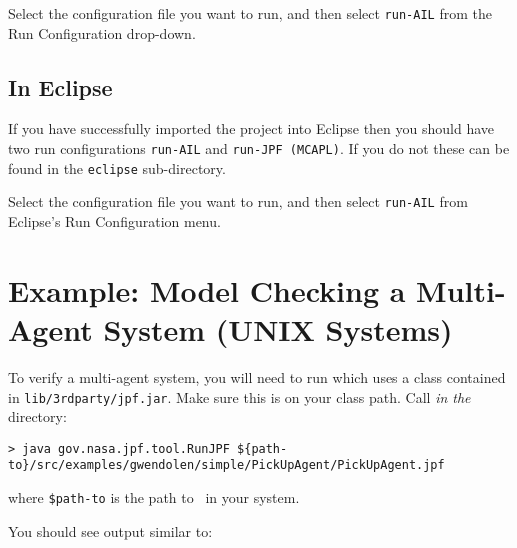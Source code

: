Select the configuration file you want to run, and then select \texttt{run-AIL} from the Run Configuration drop-down.

\subsection{In Eclipse}

If you have successfully imported the project into Eclipse then you should have two run configurations \texttt{run-AIL} and \texttt{run-JPF (MCAPL)}.  If you do not these can be found in the \texttt{eclipse} sub-directory.

Select the configuration file you want to run, and then select \texttt{run-AIL} from Eclipse's Run Configuration menu.


\section{Example: Model Checking a Multi-Agent System (UNIX Systems)}

To verify a multi-agent system, you will need to run \jpf which uses a class contained in \texttt{lib/3rdparty/jpf.jar}.  Make sure this is on your class path.  Call \emph{in the \ajpfversion} directory:

\noindent \begin{lstlisting}[basicstyle=\tiny]
> java gov.nasa.jpf.tool.RunJPF ${path-to}/src/examples/gwendolen/simple/PickUpAgent/PickUpAgent.jpf
\end{lstlisting}
\medskip

\noindent where \texttt{\${path-to}} is the path to \ajpfversion\ in your system.

You should see output similar to: 

